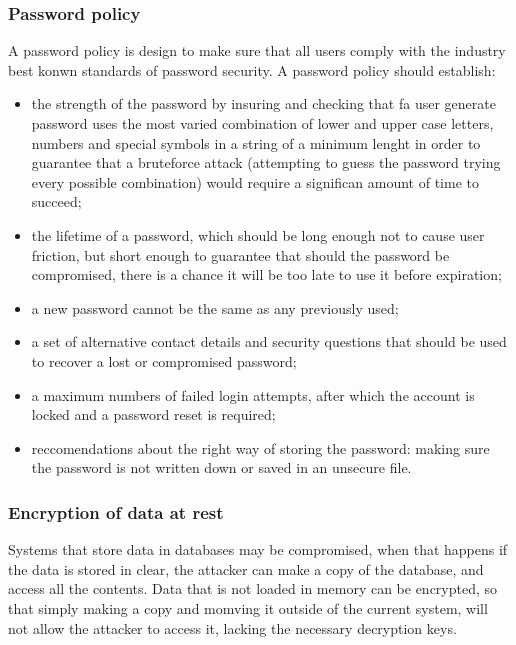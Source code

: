 \subsubsection{Password policy}
A password policy is design to make sure that all users comply with the industry
best konwn standards of password security. A password policy should
establish:
\begin{itemize}
  \item the strength of the password by insuring and checking that fa user
  generate password uses the most varied combination of lower and upper case
  letters, numbers and special symbols in a string of a minimum lenght in order
  to guarantee that a bruteforce attack (attempting to guess the password
  trying every possible combination) would require a significan amount of time
  to succeed;
  \item the lifetime of a password, which should be long enough not to cause
  user friction, but short enough to guarantee that should the password be
  compromised, there is a chance it will be too late to use it before
  expiration;
  \item a new password cannot be the same as any previously used;
  \item a set of alternative contact details and security questions that should
  be used to recover a lost or compromised password;
  \item a maximum numbers of failed login attempts, after which the account is
  locked and a password reset is required;
  \item reccomendations about the right way of storing the password: making sure
  the password is not written down or saved in an unsecure file.
\end{itemize}

\subsubsection{Encryption of data at rest}
Systems that store data in databases may be compromised, when that happens if
the data is stored in clear, the attacker can make a copy of the database, and
access all the contents. Data that is not loaded in memory can be encrypted, so
that simply making a copy and momving it outside of the current system, will not
allow the attacker to access it, lacking the necessary decryption keys.

